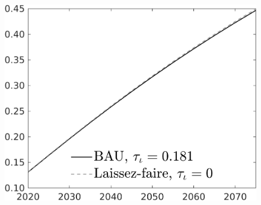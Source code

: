 \documentclass[12pt]{article}
\begin{document}
\begin{figure}[h!!]
\begin{minipage}[]{0.32\textwidth}
	\end{minipage}	
	\begin{minipage}[]{0.32\textwidth}
		\includegraphics[width=1\textwidth]{../../codding_model/own_basedOnFried/optimalPol_010922_revision/figures/all_13Sept22/CompTaul_Equlab_LFBAU_Reg0_GFF_spillover0_nsk0_xgr1_knspil0_sep1_countec0_GovRev0_etaa0.79_lgd1.png}
	\end{minipage}	
\end{figure}
\end{document}
